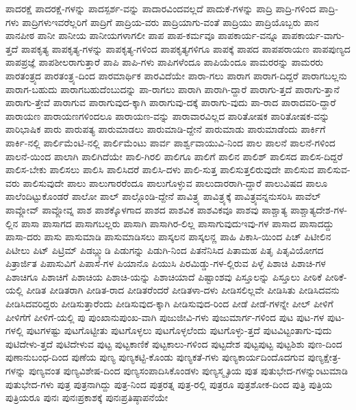 {ಪಾದರಕ್ಷೆ
ಪಾದರಕ್ಷೆ-ಗಳನ್ನು
ಪಾದಸ್ಪರ್ಶ-ವನ್ನು
ಪಾದಾರವಿಂದವಲ್ಲದೆ
ಪಾದುಕೆ-ಗಳನ್ನು
ಪಾದ್ರಿ
ಪಾದ್ರಿ-ಗಳಿಂದ
ಪಾದ್ರಿ-ಗಳು
ಪಾದ್ರಿಗಳುಇವರೆಲ್ಲರಿಗೆ
ಪಾದ್ರಿಗೆ
ಪಾದ್ರಿಯ-ವರು
ಪಾದ್ರಿಯಾಗು-ವಂತೆ
ಪಾದ್ರಿಯು
ಪಾದ್ರಿಯೊಬ್ಬರು
ಪಾನ
ಪಾನಪೀಠ
ಪಾನೀ
ಪಾನೀಯ
ಪಾನೀಯಗಳಾಗಲೀ
ಪಾಪ
ಪಾಪ-ಕರ್ಮವೂ
ಪಾಪಕಾರ್ಯ-ವನ್ನೂ
ಪಾಪಕಾರ್ಯ-ವಾಗು-ತ್ತದೆ
ಪಾಪಕೃತ್ಯ
ಪಾಪಕೃತ್ಯ-ಗಳನ್ನು
ಪಾಪಕೃತ್ಯ-ಗಳಿಂದ
ಪಾಪಕೃತ್ಯಗಳಿಗೂ
ಪಾಪಕ್ಕೆ
ಪಾಪದ
ಪಾಪಪರಾಯಣ
ಪಾಪಪುಣ್ಯದ
ಪಾಪಪ್ರಜ್ಞೆ
ಪಾಪಶೀಲರಾಗುತ್ತಾರೆ
ಪಾಪಿ
ಪಾಪಿ-ಗಳು
ಪಾಪಿಗಳೆಂದೂ
ಪಾಪಿಯೆಂದೂ
ಪಾಮರರನ್ನು
ಪಾಮರರು
ಪಾರತಂತ್ರ್ಯದ
ಪಾರತಂತ್ರ್ಯ-ದಿಂದ
ಪಾರಮಾರ್ಥಿಕ
ಪಾರವಿದೆಯೇ
ಪಾರಾ-ಗಲು
ಪಾರಾಗ
ಪಾರಾಗ-ದಿದ್ದರೆ
ಪಾರಾಗಬಲ್ಲನು
ಪಾರಾಗ-ಬಹುದು
ಪಾರಾಗಬಹುದೆಂಬುದನ್ನು
ಪಾ-ರಾಗಲು
ಪಾರಾಗಿ
ಪಾರಾಗಿ-ದ್ದಾರೆ
ಪಾರಾಗು-ತ್ತದೆ
ಪಾರಾಗು-ತ್ತಾನೆ
ಪಾರಾಗು-ತ್ತೇವೆ
ಪಾರಾಗುವ
ಪಾರಾಗುವುದ-ಕ್ಕಾಗಿ
ಪಾರಾಗುವು-ದಕ್ಕೆ
ಪಾರಾಗು-ವುದು
ಪಾ-ರಾದ
ಪಾರಾದವರಿ-ದ್ದಾರೆ
ಪಾರಾಯಣ
ಪಾರಾಯಣಗಳಿಂದಲೂ
ಪಾರಾಯಣ-ವನ್ನು
ಪಾರಾವಾರವಿಲ್ಲದ
ಪಾರಿತೋಷಕ
ಪಾರಿತೋಷಕ-ವನ್ನು
ಪಾರಿಭಾಷಿಕ
ಪಾರು
ಪಾರುಪತ್ಯ
ಪಾರುಮಾಡಲು
ಪಾರುಮಾಡಿ-ದ್ದೇನೆ
ಪಾರುಮಾಡು
ಪಾರುಮಾಡೆಂದು
ಪಾರ್ಕಿಗೆ
ಪಾರ್ಕಿ-ನಲ್ಲಿ
ಪಾರ್ಲಿಮೆಂಟಿ-ನಲ್ಲಿ
ಪಾರ್ಲಿಮೆಂಟು
ಪಾರ್ವ
ಪಾರ್ಶ್ವವಾಯುವಿ-ನಿಂದ
ಪಾಲ
ಪಾಲನೆ
ಪಾಲನೆ-ಗಳಿಂದ
ಪಾಲನೆ-ಯಿಂದ
ಪಾಲಾಗಿ
ಪಾಲಿಗಿದೆಯೇ
ಪಾಲಿ-ಗಿರಲಿ
ಪಾಲಿಗೂ
ಪಾಲಿಗೆ
ಪಾಲಿನ
ಪಾಲಿಶ್
ಪಾಲಿಸದ
ಪಾಲಿಸ-ದಿದ್ದರೆ
ಪಾಲಿಸ-ಬೇಕು
ಪಾಲಿಸಲು
ಪಾಲಿಸಿ
ಪಾಲಿಸಿದರೆ
ಪಾಲಿಸಿ-ದಳು
ಪಾಲಿ-ಸುತ್ತ
ಪಾಲಿಸುತ್ತಲಿರುವುದೇ
ಪಾಲಿಸುವ
ಪಾಲಿಸುವ-ವರು
ಪಾಲಿಸುವುದೇ
ಪಾಲು
ಪಾಲುಗಾರರೆಂದೂ
ಪಾಲುಗೊಳ್ಳುವ
ಪಾಲುದಾರರಾಗಿ-ದ್ದಾರೆ
ಪಾಲುವಿಷದ
ಪಾಲೂ
ಪಾಲೆಂದಿಟ್ಟುಕೊಂಡರೆ
ಪಾಲೋ
ಪಾಲ್
ಪಾಲ್ಗೊಂಡಿ-ದ್ದೇನೆ
ಪಾವಿತ್ರ್ಯ
ಪಾವಿತ್ರ್ಯಕ್ಕೆ
ಪಾವಿತ್ರ್ಯವನ್ನನುಸರಿಸಿ
ಪಾವೆಲ್
ಪಾವ್ಲೋವ್
ಪಾವ್ಲೋವ್ನ
ಪಾಶ
ಪಾಶಕ್ಕೊಳಗಾದ
ಪಾಶದ
ಪಾಶವಿಕ
ಪಾಶವಿಕವೂ
ಪಾಶವು
ಪಾಶ್ಚಾತ್ಯ
ಪಾಶ್ಚಾತ್ಯದೇಶ-ಗಳ-ಲ್ಲಿನ
ಪಾಸಾ
ಪಾಸಾಗದ
ಪಾಸಾಗಬಲ್ಲರು
ಪಾಸಾಗಿ
ಪಾಸಾಗಿರ-ಲಿಲ್ಲ
ಪಾಸಾಗುವುದುಇವು-ಗಳ
ಪಾಸಾದ
ಪಾಸಾದದ್ದು
ಪಾಸಾ-ದರು
ಪಾಸು
ಪಾಸುಮಾಡಿ
ಪಾಸುಮಾಡಿಸಲು
ಪಾಸ್ಕಲನ
ಪಾಸ್ಕಲನ್ಣ
ಪಾಹಿ
ಪಿಕಾಸಿ-ಯಿಂದ
ಪಿಚ್
ಪಿಟೀಲಿನ
ಪಿಟೀಲು
ಪಿಟ್
ಪಿಟ್ರಿಮ್
ಪಿಡಬ್ಲ್ಯುಡಿ
ಪಿಡುಗನ್ನು
ಪಿಡುಗಿ-ನಿಂದ
ಪಿತನೆನಿಸಿದ
ಪಿತಾಮಹ
ಪಿತೃ
ಪಿತೃವಿಯೋಗದ
ಪಿತ್ರಾರ್ಜಿತ
ಪಿಪಾಸುವಿಗೆ
ಪಿಪಾಸೆ-ಗಳ
ಪಿಯಾನೊ
ಪಿಯುಸಿ
ಪಿರಮಿಡ್ಡು-ಗಳ-ಲ್ಲಿರುವ
ಪಿಳ್ಳೆ
ಪಿಶಾಚಿ
ಪಿಶಾಚಿ-ಗಳ
ಪಿಶಾಚಿಗೂ
ಪಿಶಾಚಿಗೆ
ಪಿಶಾಚಿಯ
ಪಿಶಾಚಿ-ಯನ್ನು
ಪಿಶಾಚಿಯಾದೆ
ಪಿಷ್ಟಾಂಶವು
ಪಿಸ್ತೂಲನ್ನು
ಪಿಸ್ತೂಲು
ಪೀಠಿಕೆ
ಪೀಠಿಕೆ-ಯಲ್ಲಿ
ಪೀಡಿತ
ಪೀಡಿತರಾಗಿ
ಪೀಡಿತ-ರಾದ
ಪೀಡಿತರೆಂದರೆ
ಪೀಡಿತಳಾ-ದಳು
ಪೀಡಿಸಲಿಲ್ಲವೇ
ಪೀಡಿಸಿತು
ಪೀಡಿಸಿದವನು
ಪೀಡಿಸಿದವರಿದ್ದರು
ಪೀಡಿಸುತ್ತಾರೆಂದು
ಪೀಡಿಸುವುದ-ಕ್ಕಾಗಿ
ಪೀಡಿಸುವುದ-ರಿಂದ
ಪೀಡೆ
ಪೀಡೆ-ಗಳನ್ನೇ
ಪೀಲ್
ಪೀಳಿಗೆ
ಪೀಳಿಗೆಗೆ
ಪೀಳಿಗೆ-ಯಲ್ಲಿ
ಪು
ಪುಂಖಾನುಪುಂಖ-ವಾಗಿ
ಪುಜುಜೀವಿ-ಗಳು
ಪುಜುಮಾರ್ಗ-ಗಳಿಂದ
ಪುಟ
ಪುಟ-ಗಳ
ಪುಟ-ಗಳಲ್ಲಿ
ಪುಟಗಳಷ್ಟು
ಪುಟಗೊಟ್ಟೀತು
ಪುಟಗೊಳ್ಳಲು
ಪುಟಗೊಳ್ಳಲೆಂದು
ಪುಟಗೊಳ್ಳು-ತ್ತದೆ
ಪುಟವಿಟ್ಟಂತಾಗು-ವುದು
ಪುಟಿದೇಳು-ತ್ತದೆ
ಪುಟಿದೇಳುವ
ಪುಟ್ಟ
ಪುಟ್ಟಕಾಣಿಕೆ
ಪುಟ್ಟಕಾಲು-ಗಳಿಂದ
ಪುಟ್ಟದೇಶ
ಪುಟ್ಟಪುಟ್ಟ
ಪುಟ್ಟಶಿಶು
ಪುಣ-ದಿಂದ
ಪುಣಾನುಬಂಧ-ದಿಂದ
ಪುಣೆಯ
ಪುಣ್ಯ
ಪುಣ್ಯಕಟ್ಟಿ-ಕೊಂಡು
ಪುಣ್ಯಕತೆ-ಗಳು
ಪುಣ್ಯಕಾರ್ಯದಿಂದೊದಗುವ
ಪುಣ್ಯಕ್ಷೇತ್ರ-ಗಳನ್ನು
ಪುಣ್ಯವಂತ
ಪುಣ್ಯವಿಶೇಷ-ದಿಂದ
ಪುಣ್ಯಸಂಪಾದಿಸಿಕೊಂಡಳು
ಪುಣ್ಯಸ್ಮೃತಿಯ
ಪುತ
ಪುತುಭೇದ-ಗಳನ್ನುಂಟುಮಾಡಿ
ಪುತುಭೇದ-ಗಳು
ಪುತ್ರ
ಪುತ್ರನಾಗಿದ್ದು
ಪುತ್ರ-ನಿಂದ
ಪುತ್ರರತ್ನ
ಪುತ್ರ-ರಲ್ಲಿ
ಪುತ್ರರೂ
ಪುತ್ರಶೋಕ-ದಿಂದ
ಪುತ್ರಿ
ಪುತ್ರಿಯ
ಪುತ್ರಿಯರೂ
ಪುನಃ
ಪುನಃಪ್ರಕಾಶಕ್ಕೆ
ಪುನಃಪ್ರತಿಷ್ಠಾಪನೆಯೇ
}
